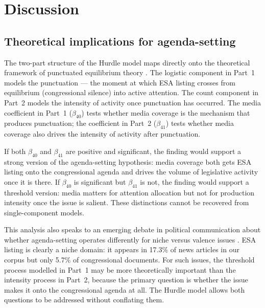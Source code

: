 \documentclass[11pt]{article}
\begin{document}
\section{Discussion}
 
\subsection{Theoretical implications for agenda-setting}
 
The two-part structure of the Hurdle model maps directly onto the
theoretical framework of punctuated equilibrium theory
\citep{Baumgartner1993, Jones2004}. The logistic component in Part~1
models the punctuation --- the moment at which ESA listing crosses
from equilibrium (congressional silence) into active attention. The
count component in Part~2 models the intensity of activity once
punctuation has occurred. The media coefficient in Part~1 ($\beta_{40}$)
tests whether media coverage is the mechanism that produces punctuation;
the coefficient in Part~2 ($\beta_{41}$) tests whether media coverage
also drives the intensity of activity after punctuation.
 
If both $\beta_{40}$ and $\beta_{41}$ are positive and significant, the
finding would support a strong version of the agenda-setting hypothesis:
media coverage both gets ESA listing onto the congressional agenda and
drives the volume of legislative activity once it is there. If
$\beta_{40}$ is significant but $\beta_{41}$ is not, the finding would
support a threshold version: media matters for attention allocation but
not for production intensity once the issue is salient. These
distinctions cannot be recovered from single-component models.
 
This analysis also speaks to an emerging debate in political
communication about whether agenda-setting operates differently for
niche versus valence issues \citep{Walgrave2008}. ESA listing is
clearly a niche domain: it appears in 17.3\% of news articles in our
corpus but only 5.7\% of congressional documents. For such issues,
the threshold process modelled in Part~1 may be more theoretically
important than the intensity process in Part~2, because the primary
question is whether the issue makes it onto the congressional agenda
at all. The Hurdle model allows both questions to be addressed without
conflating them.
 
\end{document}
